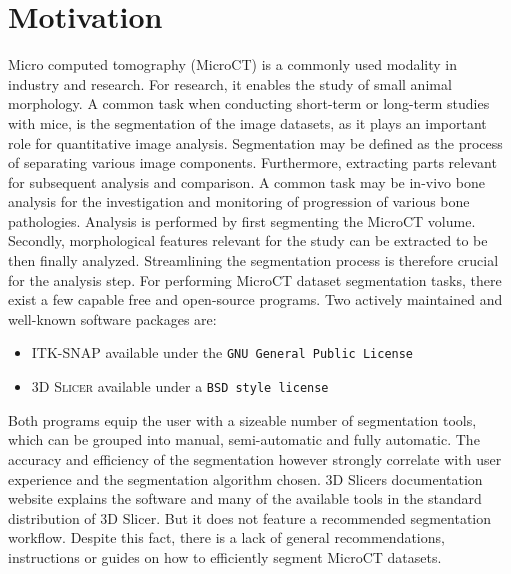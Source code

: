 \section{Motivation}
\label{s:introduction-motivation}
Micro computed tomography (MicroCT) is a commonly used modality in industry and research.
For research, it enables the study of small animal morphology\cite{percianoInsight3DMicroCT2017}.
A common task when conducting short-term or long-term studies with mice, is the segmentation of the image datasets, as it plays an important role for quantitative image analysis\cite{sheppardTechniquesHelicalScanning2014}.
Segmentation may be defined as the process of separating various image components.
Furthermore, extracting parts relevant for subsequent analysis and comparison\cite{percianoInsight3DMicroCT2017}.
A common task may be in-vivo bone analysis for the investigation and monitoring of progression of various bone pathologies.
Analysis is performed by first segmenting the MicroCT volume.
Secondly, morphological features relevant for the study can be extracted to be then finally analyzed.
Streamlining the segmentation process is therefore crucial for the analysis step\cite{percianoInsight3DMicroCT2017,korfiatisIndependentActiveContours2017}.
\newline
For performing MicroCT dataset segmentation tasks, there exist a few capable free and open-source programs.
Two actively maintained and well-known\cite{virziComprehensiveReview3D2020,mandoliniComparisonThree3D2022,virziComprehensiveReview3D2020} software packages are:
\begin{itemize}
	\item \textsc{ITK-SNAP}\cite{yushkevichUserguided3DActive2006} available under the \texttt{GNU General Public License}\cite{licenseGnuGeneralPublic1989}
	\item \textsc{3D Slicer}\cite{kikinis3DSlicerPlatform2014} available under a \texttt{BSD style license}\cite{gaudeulPublicProvisionPrivate2005}
\end{itemize}
Both programs equip the user with a sizeable number of segmentation tools, which can be grouped into manual, semi-automatic and fully automatic\cite{percianoInsight3DMicroCT2017}.
The accuracy and efficiency of the segmentation however strongly correlate with user experience and the segmentation algorithm chosen\cite{mandoliniComparisonThree3D2022,aydinRELIABILITYREPRODUCIBILITYTIMEEFFICIENCY2020,arguelloComparisonSegmentationTools2019}.
3D Slicers documentation website\cite{pinterPolymorphSegmentationRepresentation2019} explains the software and many of the available tools in the standard distribution of 3D Slicer.
But it does not feature a recommended segmentation workflow.
Despite this fact, there is a lack of general recommendations, instructions or guides on how to efficiently segment MicroCT datasets.

